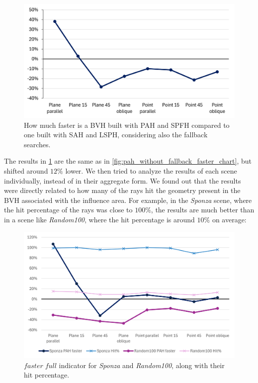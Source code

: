 \documentclass{PoliMi_MasterThesis}
\begin{document}
\begin{figure}[H] 
	\centering
	\includegraphics[width=\textwidth]{Images/pah_faster_chart.png}
	\caption{How much faster is a BVH built with PAH and SPFH compared to one built with SAH and LSPH, considering also the fallback searches.}
	\label{fig:pah_faster_chart}
\end{figure}

The results in \ref{fig:pah_faster_chart} are the same as in \ref{fig:pah_without_fallback_faster_chart}, but shifted around $12\%$ lower. We then tried to analyze the results of each scene individually, instead of in their aggregate form. We found out that the results were directly related to how many of the rays hit the geometry present in the BVH associated with the influence area. For example, in the \textit{Sponza} scene, where the hit percentage of the rays was close to $100\%$, the results are much better than in a scene like \textit{Random100}, where the hit percentage is around $10\%$ on average:

\begin{figure}[H] 
	\centering
	\includegraphics[width=\textwidth]{Images/sponza_vs_random100.png}
	\caption{$faster\; full$ indicator for \textit{Sponza} and \textit{Random100}, along with their hit percentage.}
	\label{fig:sponza_vs_random100}
\end{figure}
\end{document}
